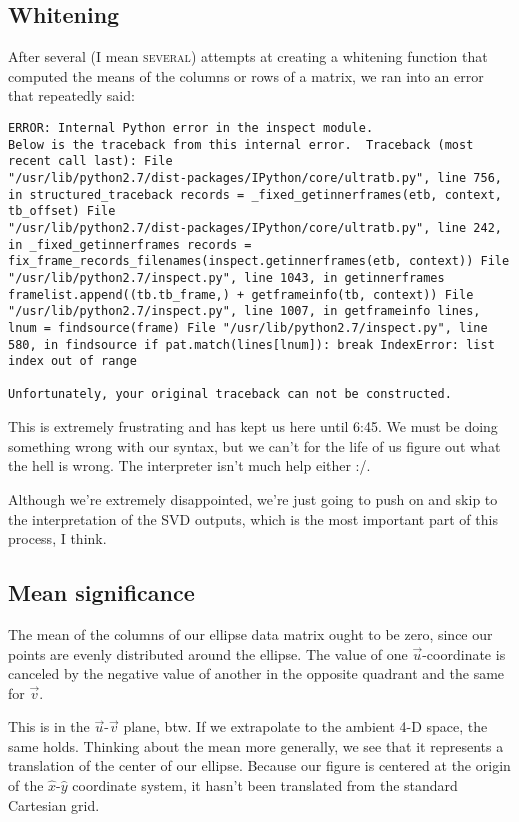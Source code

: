 \documentclass{article}
\begin{document}
\subsection{Whitening}
\label{whitening}
After several (I mean \textsc{several}) attempts at
creating a whitening function that computed the means of the columns
or rows of a matrix, we ran into an error that repeatedly said:
\begin{verbatim}
ERROR: Internal Python error in the inspect module.
Below is the traceback from this internal error.  Traceback (most
recent call last): File
"/usr/lib/python2.7/dist-packages/IPython/core/ultratb.py", line 756,
in structured_traceback records = _fixed_getinnerframes(etb, context,
tb_offset) File
"/usr/lib/python2.7/dist-packages/IPython/core/ultratb.py", line 242,
in _fixed_getinnerframes records =
fix_frame_records_filenames(inspect.getinnerframes(etb, context)) File
"/usr/lib/python2.7/inspect.py", line 1043, in getinnerframes
framelist.append((tb.tb_frame,) + getframeinfo(tb, context)) File
"/usr/lib/python2.7/inspect.py", line 1007, in getframeinfo lines,
lnum = findsource(frame) File "/usr/lib/python2.7/inspect.py", line
580, in findsource if pat.match(lines[lnum]): break IndexError: list
index out of range

Unfortunately, your original traceback can not be constructed.
\end{verbatim}

This is extremely frustrating and has kept us here until 6:45. We must
be doing something wrong with our syntax, but we can't for the life of
us figure out what the hell is wrong.  The interpreter isn't much help
either :/.

Although we're extremely disappointed, we're just going to push on and
skip to the interpretation of the SVD outputs, which is the most
important part of this process, I think.

\subsection{Mean significance}
\label{mean}

The mean of the columns of our ellipse data matrix ought to be zero,
since our points are evenly distributed around the ellipse.  The value
of one $\vec{u}$-coordinate is canceled by the negative value of
another in the opposite quadrant and the same for $\vec{v}$.

This is in the $\vec{u}$-$\vec{v}$ plane, btw.  If we extrapolate to
the ambient 4-D space, the same holds.  Thinking about the mean more
generally, we see that it represents a translation of the center of
our ellipse.  Because our figure is centered at the origin of the
$\hat{x}$-$\hat{y}$ coordinate system, it hasn't been translated from
the standard Cartesian grid.
\end{document}
